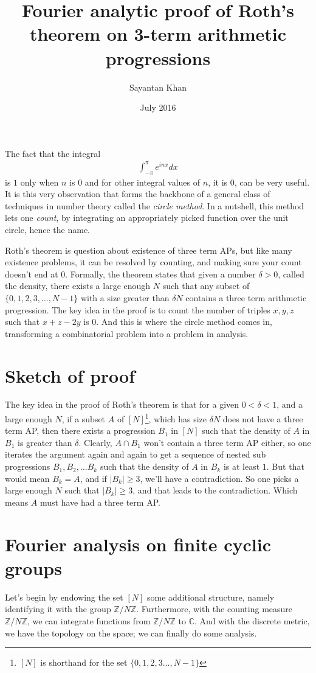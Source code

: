 \documentclass[12pt]{article}
\title{Fourier analytic proof of Roth's theorem on 3-term arithmetic progressions}
\author{Sayantan Khan}
\date{July 2016}
\theoremstyle{definition}
\newcommand{\znz}{\mathbb{Z}/N\mathbb{Z}}
\begin{document}
\maketitle

The fact that the integral
\begin{align*}
    \int_{-\pi}^{\pi} e^{inx} dx
\end{align*}
is $1$ only when $n$ is $0$ and for other integral values of $n$, it is $0$, can be very useful. It is this very observation that forms the backbone of a general class of techniques in number theory called the \emph{circle method}. In a nutshell, this method lets one \emph{count}, by integrating an appropriately picked function over the unit circle, hence the name.

Roth's theorem is question about existence of three term APs, but like many existence problems, it can be resolved by counting, and making sure your count doesn't end at $0$. Formally, the theorem states that given a number $\delta > 0$, called the density, there exists a large enough $N$ such that any subset of $\{0,1, 2, 3, \ldots, N-1\}$ with a size greater than $\delta N$ contains a  three term arithmetic progression.  The key idea in the proof is to count the number of triples $x,y,z$ such that $x+z-2y$ is $0$. And this is where the circle method comes in, transforming a combinatorial problem into a problem in analysis.

\section{Sketch of proof}
The key idea in the proof of Roth's theorem is that for a given $0 < \delta < 1$, and a large enough $N$, if a subset $A$ of $[N]$\footnote{$[N]$ is shorthand for the set $\{0,1, 2,3 \ldots, N-1\}$}, which has size $\delta N$ does not have a three term AP, then there exists a progression $B_1$ in $[N]$ such that the density of $A$ in $B_1$ is greater than $\delta$. Clearly, $A \cap B_1$ won't contain a three term AP either, so one iterates the argument again and again to get a sequence of nested sub progressions $B_1, B_2, \ldots B_k$ such that the density of $A$ in $B_k$ is at least $1$. But that would mean $B_k = A$, and if $|B_k| \geq 3$, we'll have a contradiction. So one picks a large enough $N$ such that $|B_k| \geq 3$, and that leads to the contradiction. Which means $A$ must have had a three term AP.

\section{Fourier analysis on finite cyclic groups}
Let's begin by endowing the set $[N]$ some additional structure, namely identifying it with the group $\znz$. Furthermore, with the counting measure $\znz$, we can integrate functions from $\znz$ to $\mathbb{C}$. And with the discrete metric, we have the topology on the space; we can finally do some analysis.
\end{document}
